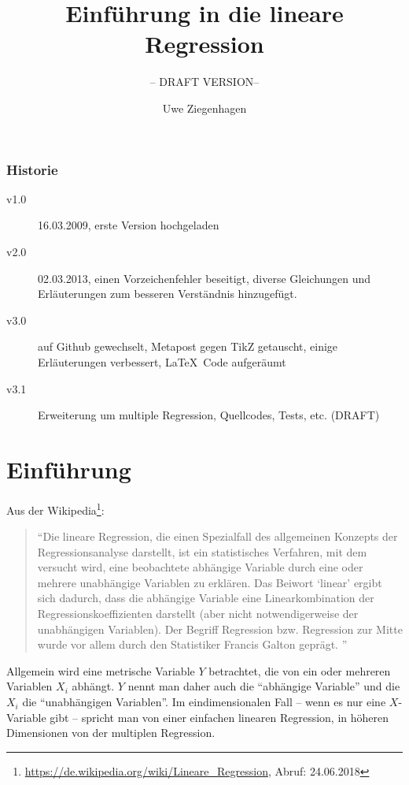 \documentclass[ngerman, 12pt]{scrartcl}
\title{Einführung in die lineare Regression}
\subtitle{-- DRAFT VERSION--}
\author{Uwe Ziegenhagen}
\begin{document}
\maketitle

\subsubsection*{Historie}

\begin{description}
\item[v1.0] 16.03.2009, erste Version hochgeladen
\item[v2.0] 02.03.2013, einen Vorzeichenfehler beseitigt, diverse Gleichungen und Erläuterungen zum besseren Verständnis hinzugefügt.
\item [v3.0] auf Github gewechselt, Metapost gegen TikZ getauscht, einige Erläuterungen verbessert, \LaTeX\ Code aufgeräumt
\item [v3.1] Erweiterung um multiple Regression, Quellcodes, Tests, etc. (DRAFT) 
\end{description}

\section{Einführung}

Aus der Wikipedia\footnote{\url{https://de.wikipedia.org/wiki/Lineare_Regression}, Abruf: 24.06.2018}: 

\begin{quote}
\enquote{Die lineare Regression, die einen Spezialfall des allgemeinen Konzepts der Regressionsanalyse darstellt, ist ein statistisches Verfahren, mit dem versucht wird, eine beobachtete abhängige Variable durch eine oder mehrere unabhängige Variablen zu erklären. Das Beiwort \enquote{linear} ergibt sich dadurch, dass die abhängige Variable eine Linearkombination der Regressionskoeffizienten darstellt (aber nicht notwendigerweise der unabhängigen Variablen). Der Begriff Regression bzw. Regression zur Mitte wurde vor allem durch den Statistiker Francis Galton geprägt. 
}\end{quote}

Allgemein wird eine metrische Variable $Y$ betrachtet, die von ein oder mehreren Variablen $X_i$ abhängt. $Y$ nennt man daher auch die \enquote{abhängige Variable} und die $X_i$ die \enquote{unabhängigen Variablen}.  Im eindimensionalen Fall -- wenn es nur eine $X$-Variable gibt -- spricht man von einer einfachen linearen Regression, in höheren Dimensionen von der multiplen Regression.
\end{document}
